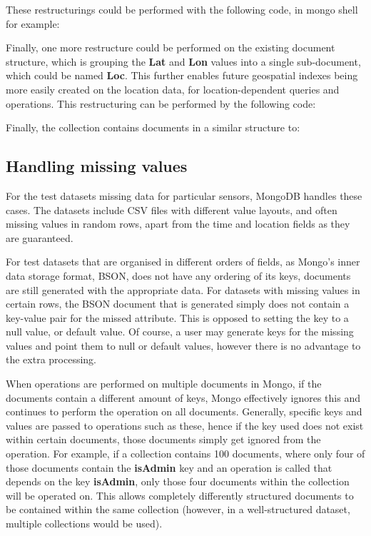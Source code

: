\documentclass[a4paper,11pt]{article}
\begin{document}

These restructurings could be performed with the following code, in mongo shell for example:


Finally, one more restructure could be performed on the existing document structure, which is grouping the \textbf{Lat}
and \textbf{Lon} values into a single sub-document, which could be named \textbf{Loc}. This further enables future
geospatial indexes being more easily created on the location data, for location-dependent queries and operations.
This restructuring can be performed by the following code:


Finally, the collection contains documents in a similar structure to:



\subsection{Handling missing values} %
\label{sub:handling_missing_values}

For the test datasets missing data for particular sensors, MongoDB handles these cases. The datasets include
CSV files with different value layouts, and often missing values in random rows, apart from the time and location fields
as they are guaranteed.

For test datasets that are organised in different orders of fields, as Mongo's inner data storage format, BSON, does
not have any ordering of its keys, documents are still generated with the appropriate data. For datasets with missing
values in certain rows, the BSON document that is generated simply does not contain a key-value pair for the missed
attribute. This is opposed to setting the key to a null value, or default value. Of course, a user may generate keys
for the missing values and point them to null or default values, however there is no advantage to the extra processing.

When operations are performed on multiple documents in Mongo, if the documents contain a different amount of keys, Mongo
effectively ignores this and continues to perform the operation on all documents. Generally, specific keys and values
are passed to operations such as these, hence if the key used does not exist within certain documents, those documents
simply get ignored from the operation. For example, if a collection contains 100 documents, where only four of those
documents contain the \textbf{isAdmin} key and an operation is called that depends on the key \textbf{isAdmin}, only
those four documents within the collection will be operated on. This allows completely differently structured documents
to be contained within the same collection (however, in a well-structured dataset, multiple collections would be used).
\end{document}
